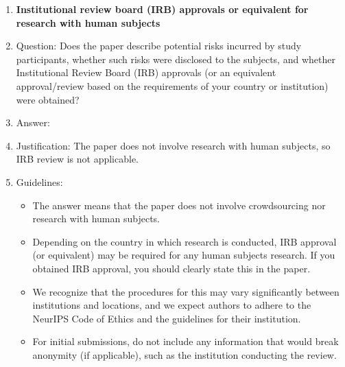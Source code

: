 \begin{enumerate}
\item {\bf Institutional review board (IRB) approvals or equivalent for research with human subjects}
    \item[] Question: Does the paper describe potential risks incurred by study participants, whether such risks were disclosed to the subjects, and whether Institutional Review Board (IRB) approvals (or an equivalent approval/review based on the requirements of your country or institution) were obtained?
    \item[] Answer: \answerNA{}
    \item[] Justification: The paper does not involve research with human subjects, so IRB review is not applicable.
    \item[] Guidelines:
    \begin{itemize}
        \item The answer \answerNA{} means that the paper does not involve crowdsourcing nor research with human subjects.
        \item Depending on the country in which research is conducted, IRB approval (or equivalent) may be required for any human subjects research. If you obtained IRB approval, you should clearly state this in the paper.
        \item We recognize that the procedures for this may vary significantly between institutions and locations, and we expect authors to adhere to the NeurIPS Code of Ethics and the guidelines for their institution.
        \item For initial submissions, do not include any information that would break anonymity (if applicable), such as the institution conducting the review.
    \end{itemize}


\end{enumerate}
